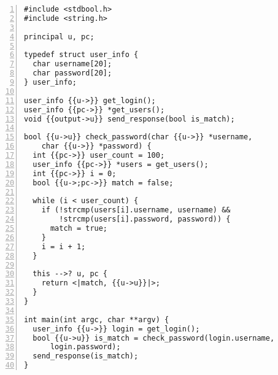 \begin{lstlisting}[float, style=dlmc, numbers=left, caption={Labelled password checker example}, label=example:code:check_password-explicit]
#include <stdbool.h>
#include <string.h>

principal u, pc;

typedef struct user_info {
  char username[20];
  char password[20];
} user_info;

user_info {{u->}} get_login();
user_info {{pc->}} *get_users();
void {{output->u}} send_response(bool is_match);

bool {{u->u}} check_password(char {{u->}} *username,
    char {{u->}} *password) {
  int {{pc->}} user_count = 100;
  user_info {{pc->}} *users = get_users();
  int {{pc->}} i = 0;
  bool {{u->;pc->}} match = false;

  while (i < user_count) {
    if (!strcmp(users[i].username, username) &&
        !strcmp(users[i].password, password)) {
      match = true;
    }
    i = i + 1;
  }

  this -->? u, pc {
    return <|match, {{u->u}}|>;
  }
}

int main(int argc, char **argv) {
  user_info {{u->}} login = get_login();
  bool {{u->u}} is_match = check_password(login.username,
      login.password);
  send_response(is_match);
}
\end{lstlisting}
